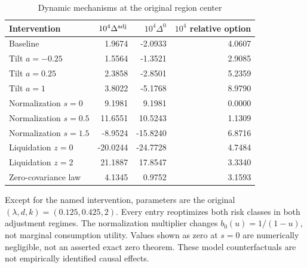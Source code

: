 \begin{table}[htbp]
\centering
\caption{Dynamic mechanisms at the original region center}\label{tab:r8_mechanisms}
\small
\begin{tabular}{lrrr}
\toprule
Intervention & $10^4\Delta^{\rm adj}$ & $10^4\Delta^0$ & $10^4$ relative option \\
\midrule
Baseline & 1.9674 & -2.0933 & 4.0607 \\
Tilt $a=-0.25$ & 1.5564 & -1.3521 & 2.9085 \\
Tilt $a=0.25$ & 2.3858 & -2.8501 & 5.2359 \\
Tilt $a=1$ & 3.8022 & -5.1768 & 8.9790 \\
Normalization $s=0$ & 9.1981 & 9.1981 & 0.0000 \\
Normalization $s=0.5$ & 11.6551 & 10.5243 & 1.1309 \\
Normalization $s=1.5$ & -8.9524 & -15.8240 & 6.8716 \\
Liquidation $z=0$ & -20.0244 & -24.7728 & 4.7484 \\
Liquidation $z=2$ & 21.1887 & 17.8547 & 3.3340 \\
Zero-covariance law & 4.1345 & 0.9752 & 3.1593 \\
\bottomrule
\end{tabular}
\par\vspace{3pt}\begin{minipage}{0.96\textwidth}\footnotesize Except for the named intervention, parameters are the original $(\lambda,d,k)=(0.125,0.425,2)$. Every entry reoptimizes both risk classes in both adjustment regimes. The normalization multiplier changes $b_0(u)=1/(1-u)$, not marginal consumption utility. Values shown as zero at $s=0$ are numerically negligible, not an asserted exact zero theorem. These model counterfactuals are not empirically identified causal effects.\end{minipage}
\end{table}
